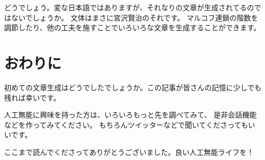 \documentclass{jsarticle}
\begin{document}
            どうでしょう。変な日本語ではありますが、それなりの文章が生成されてるのではないでしょうか。
            文体はまさに宮沢賢治のそれです。
            マルコフ連鎖の階数を調節したり、他の工夫を施すことでいろいろな文章を生成することができます。

    \section*{おわりに}
        初めての文章生成はどうでしたでしょうか。この記事が皆さんの記憶に少しでも残れば幸いです。

        人工無能に興味を持った方は、いろいろもっと先を調べてみて、
        是非会話機能などを作ってみてください。
        もちろんツイッターなどで聞いてくださってもいいです。

        ここまで読んでくださってありがとうございました。良い人工無能ライフを！
\end{document}
